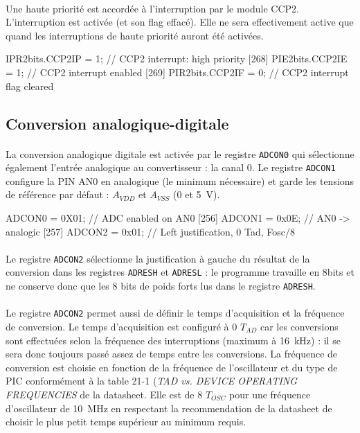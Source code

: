 \documentclass{article}
\begin{document}
    \paragraph{}
    Une haute priorité est accordée à l'interruption par le module CCP2. L'interruption est activée (et son flag effacé). Elle ne sera effectivement active que quand les interruptions de haute priorité auront été activées.
    \begin{verbatimtab}
    [267]    IPR2bits.CCP2IP = 1;    // CCP2 interrupt: high priority
    [268]    PIE2bits.CCP2IE = 1;    // CCP2 interrupt enabled
    [269]    PIR2bits.CCP2IF = 0;    // CCP2 interrupt flag cleared
    \end{verbatimtab}

    \subsection{Conversion analogique-digitale}
    \paragraph{}
    La conversion analogique digitale est activée par le registre \texttt{ADCON0} qui sélectionne également l'entrée analogique au convertisseur : la canal 0. Le registre \texttt{ADCON1} configure la PIN AN0 en analogique (le minimum nécessaire) et garde les tensions de référence par défaut : $A_{VDD}$ et $A_{VSS}$ (0 et \SI{5}{\volt}).
    \begin{verbatimtab}
    [255]    ADCON0  = 0X01;         // ADC enabled on AN0
    [256]    ADCON1  = 0x0E;         // AN0 -> analogic
    [257]    ADCON2  = 0x01;         // Left justification, 0 Tad, Fosc/8
    \end{verbatimtab}

    \paragraph{}
    Le registre \texttt{ADCON2} sélectionne la justification à gauche du résultat de la conversion dans les registres \texttt{ADRESH} et \texttt{ADRESL} : le programme travaille en 8bits et ne conserve donc que les 8 bits de poids forts lus dans le registre \texttt{ADRESH}.

    \paragraph{}
    Le registre \texttt{ADCON2} permet aussi de définir le temps d'acquisition et la fréquence de conversion. Le temps d'acquisition est configuré à 0 $T_{AD}$ car les conversions sont effectuées selon la fréquence des interruptions (maximum à \SI{16}{\kilo\hertz}) : il se sera donc toujours passé assez de temps entre les conversions. La fréquence de conversion est choisie en fonction de la fréquence de l'oscillateur et du type de PIC conformément à la table 21-1 (\emph{TAD vs. DEVICE OPERATING FREQUENCIES} de la datasheet. Elle est de 8 $T_{OSC}$ pour une fréquence d'oscillateur de \SI{10}{\mega\hertz} en respectant la recommendation de la datasheet de choisir le plus petit temps supérieur au minimum requis.
\end{document}

